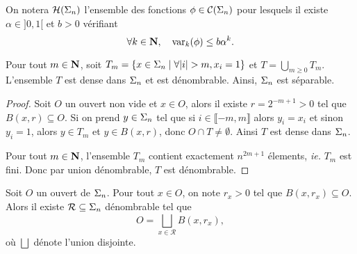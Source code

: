   \begin{definition}
    \label{def:holder_fn_set}
    \leanok
    On notera $\mathcal{H} (\Sigma_{n})$ l'ensemble des fonctions $\phi \in \mathcal{C} (\Sigma_{n})$ pour lesquels il existe $\alpha \in ]0, 1[$ et $b > 0$ vérifiant
    $$\forall k \in \mathbf N, \hspace{1em} \operatorname{var}_k(\phi) \leq b\alpha^k.$$
  \end{definition}


  \begin{proposition}
    \label{prop:separable}
    Pour tout $m \in \mathbf N$, soit $T_m = \left\{x \in \s_n \mid \forall|i|>m, x_i=1\right\}$ et $T = \bigcup_{m\geq 0}{T_m}$.
    L'ensemble $T$ est dense dans $\Sigma_n$ et est dénombrable. Ainsi, $\Sigma_n$ est séparable.
  \end{proposition}

  \begin{proof}
    Soit $O$ un ouvert non vide et $x \in O$, alors il existe $r = 2^{-m+1} > 0$ tel que $B(x, r) \subseteq O$.
    Si on prend $y \in \Sigma_n$ tel que si $i \in \llbracket -m, m \rrbracket$ alors $y_i = x_i$ et sinon $y_i = 1$,
    alors $y \in T_m$ et $y \in B(x, r)$, donc $O \cap T \not= \emptyset$. Ainsi $T$ est dense dans $\Sigma_n$.

    Pour tout $m \in \mathbf N$, l'ensemble $T_m$ contient exactement $n^{2m+1}$ élements, \textit{ie.} $T_m$ est fini.
    Donc par union dénombrable, $T$ est dénombrable.
  \end{proof}

  \begin{proposition}
    \label{prop:boules}
    Soit $O$ un ouvert de $\Sigma_n$. Pour tout $x \in O$, on note $r_x > 0$ tel que $B(x, r_x) \subseteq O$.
    Alors il existe $\mathcal R \subseteq \Sigma_n$ dénombrable tel que
    $$O = \bigsqcup_{x\in\mathcal R}{B(x, r_x)},$$
    où $\bigsqcup$ dénote l'union disjointe.
  \end{proposition}

